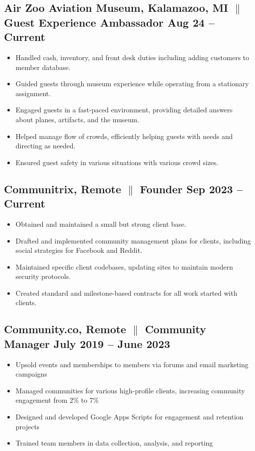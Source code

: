 \documentclass[a4paper,10pt]{article}
\begin{document}
\subsection{Air Zoo Aviation Museum, Kalamazoo, MI {$\parallel$}{
                  Guest Experience Ambassador} \hfill
      \textbf{Aug 24 – Current}}
\begin{itemize}
      \item Handled cash, inventory, and front desk duties including adding customers to member database.
      \item Guided guests through museum experience while operating from a stationary assignment.
      \item Engaged guests in a fast-paced environment, providing detailed answers about planes, artifacts, and the museum.
      \item Helped manage flow of crowds, efficiently helping guests with needs and
            directing as needed.
      \item Ensured guest safety in various situations with various crowd sizes.
\end{itemize}

\subsection{Communitrix, Remote {$\parallel$}{ Founder} \hfill
      \textbf{Sep 2023 – Current}}
\begin{itemize}
      \item Obtained and maintained a small but strong client base.
      \item Drafted and implemented community management plans for clients, including social strategies for Facebook and Reddit.
      \item Maintained specific client codebases, updating sites to maintain modern security protocols.
      \item Created standard and milestone-based contracts for all work started with clients.
\end{itemize}

\subsection{Community.co, Remote {$\parallel$}{ Community Manager} \hfill
      \textbf{July 2019 – June
            2023}}
\begin{itemize}
      \item Upsold events and memberships to members via forums and email marketing campaigns
      \item Managed communities for various high-profile clients, increasing
            community engagement from 2\% to 7\%
      \item Designed and developed Google Apps Scripts for engagement and retention
            projects
      \item Trained team members in data collection, analysis, and reporting
\end{itemize}
\end{document}
